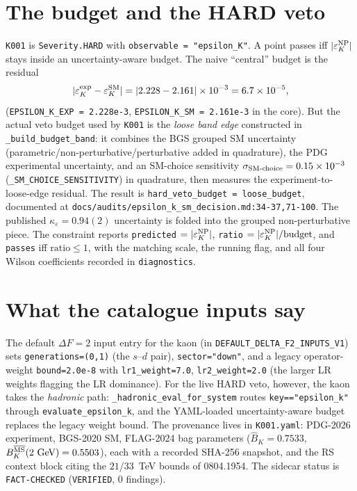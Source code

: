 \documentclass[11pt]{article}
\newcommand{\epsK}{\varepsilon_K}
\newcommand{\eps}{\varepsilon}
\newcommand{\code}[1]{\texttt{#1}}
\theoremstyle{definition}
\begin{document}
\section{The budget and the HARD veto}
\label{sec:codeveto}

\code{K001} is \code{Severity.HARD} with \code{observable = "epsilon\_K"}. A point
passes iff $|\epsK^{\rm NP}|$ stays inside an uncertainty-aware budget. The naive
``central'' budget is the residual
\begin{equation}
|\epsK^{\rm exp} - \epsK^{\rm SM}| = |2.228 - 2.161|\times10^{-3} = 6.7\times10^{-5},
\label{eq:centralbudget}
\end{equation}
(\code{EPSILON\_K\_EXP = 2.228e-3}, \code{EPSILON\_K\_SM = 2.161e-3} in the core).
But the actual veto budget used by \code{K001} is the \emph{loose band edge}
constructed in \code{\_build\_budget\_band}: it combines the BGS grouped SM
uncertainty (parametric/non-perturbative/perturbative added in quadrature), the
PDG experimental uncertainty, and an SM-choice sensitivity
$\sigma_{\rm SM\text{-}choice}=0.15\times10^{-3}$ (\code{\_SM\_CHOICE\_SENSITIVITY})
in quadrature, then measures the experiment-to-loose-edge residual. The result is
\code{hard\_veto\_budget = loose\_budget}, documented at
\code{docs/audits/epsilon\_k\_sm\_decision.md:34-37,71-100}. The published
$\kappa_\eps=0.94(2)$ uncertainty is folded into the grouped non-perturbative
piece. The constraint reports \code{predicted} $=|\epsK^{\rm NP}|$,
\code{ratio} $=|\epsK^{\rm NP}|/\text{budget}$, and \code{passes} iff
$\text{ratio}\le1$, with the matching scale, the running flag, and all four Wilson
coefficients recorded in \code{diagnostics}.

\section{What the catalogue inputs say}
\label{sec:codeinputs}

The default $\Delta F=2$ input entry for the kaon (in
\code{DEFAULT\_DELTA\_F2\_INPUTS\_V1}) sets \code{generations=(0,1)} (the $s$--$d$
pair), \code{sector="down"}, and a legacy operator-weight \code{bound=2.0e-8} with
\code{lr1\_weight=7.0}, \code{lr2\_weight=2.0} (the larger LR weights flagging the
LR dominance). For the live HARD veto, however, the kaon takes the
\emph{hadronic} path: \code{\_hadronic\_eval\_for\_system} routes \code{key=="epsilon\_k"}
through \code{evaluate\_epsilon\_k}, and the YAML-loaded uncertainty-aware budget
replaces the legacy weight bound. The provenance lives in \code{K001.yaml}:
PDG-2026 experiment, BGS-2020 SM, FLAG-2024 bag parameters ($\hat B_K=0.7533$,
$B_K^{\overline{\rm MS}}(2~\text{GeV})=0.5503$), each with a recorded SHA-256
snapshot, and the RS context block citing the $21$/$33$~TeV bounds of 0804.1954.
The sidecar status is \code{FACT-CHECKED} (\code{VERIFIED}, 0 findings).
\end{document}
